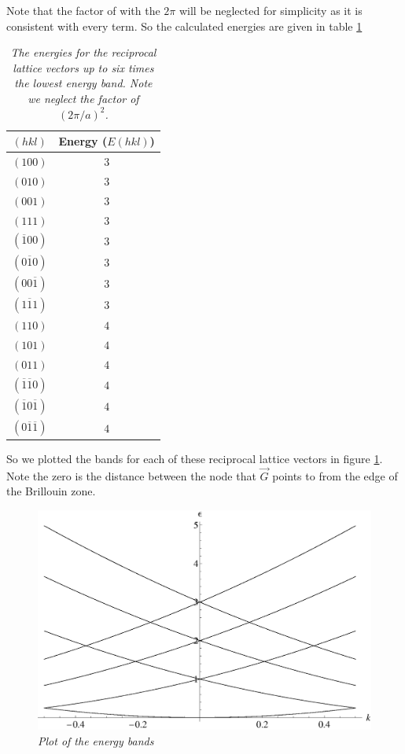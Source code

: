 \documentclass[11pt]{article}
\numberwithin{equation}{section}
\begin{document}
Note that the factor of with the $2\pi$ will be neglected for simplicity as it is consistent with every term. So the calculated energies are given in table \ref{TabProb2}
\begin{table}
\begin{centering}
\begin{tabular}{cc}
$(hkl)$	&Energy ($E(hkl)$)\\
\hline
$(100)$	&$3$ \\
$(010)$	&$3$ \\
$(001)$	&$3$ \\
$(111)$	&$3$ \\
$(\overline{1}00)$	&$3$ \\
$(0\overline{1}0)$	&$3$ \\
$(00\overline{1})$	&$3$ \\
$(\overline{111})$	&$3$ \\
$(110)$	&$4$ \\
$(101)$	&$4$ \\
$(011)$	&$4$ \\
$(\overline{1}\overline{1}0)$	&$4$ \\
$(\overline{1}0\overline{1})$	&$4$ \\
$(0\overline{1}\overline{1})$	&$4$ \\
\end{tabular}
\caption{\it{The energies for the reciprocal lattice vectors up to six times the lowest energy band. Note we neglect the factor of $(2\pi/a)^2$.}}
\label{TabProb2}
\end{centering}
\end{table}
So we plotted the bands for each of these reciprocal lattice vectors in figure \ref{Plot1}. Note the zero is the distance between the node that $\vec{G}$ points to from the edge of the Brillouin zone. 
\begin{figure}[h]
\centering
\includegraphics[scale=0.55]{Plot1.eps}
\caption{\it{Plot of the energy bands}}
\label{Plot1}
\end{figure}
\end{document}
